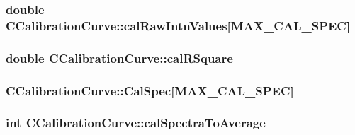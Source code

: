 \label{classCCalibrationCurve_a2b0f4f43bd32a1b4484ddcd29e3632e5}
\hypertarget{classCCalibrationCurve_a98547faad841f428235be92291e7b10e}{
\subsubsection[{calRawIntnValues}]{\setlength{\rightskip}{0pt plus 5cm}double {\bf CCalibrationCurve::calRawIntnValues}\mbox{[}MAX\_\-CAL\_\-SPEC\mbox{]}}}
\label{classCCalibrationCurve_a98547faad841f428235be92291e7b10e}
\hypertarget{classCCalibrationCurve_aea9bdb495ccb4d3f3415bb7e0a9f68e0}{
\subsubsection[{calRSquare}]{\setlength{\rightskip}{0pt plus 5cm}double {\bf CCalibrationCurve::calRSquare}}}
\label{classCCalibrationCurve_aea9bdb495ccb4d3f3415bb7e0a9f68e0}
\hypertarget{classCCalibrationCurve_a6af9fee76ca40350819d1f8d319be2e2}{
\subsubsection[{CalSpec}]{ {\bf CCalibrationCurve::CalSpec}\mbox{[}MAX\_\-CAL\_\-SPEC\mbox{]}}}
\label{classCCalibrationCurve_a6af9fee76ca40350819d1f8d319be2e2}
\hypertarget{classCCalibrationCurve_a3dca7a8cb366dea3eb9d5ad12ee9affc}{
\subsubsection[{calSpectraToAverage}]{\setlength{\rightskip}{0pt plus 5cm}int {\bf CCalibrationCurve::calSpectraToAverage}}}
